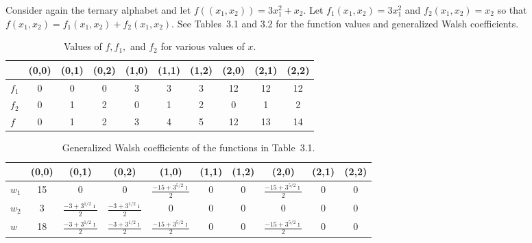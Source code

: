 \begin{example}
Consider again the ternary alphabet and let $f((x_1,x_2))=3 x_1^2 + x_2$.
Let $f_1(x_1,x_2)=3 x_1^2$ and $f_2(x_1,x_2)=x_2$ so that 
$f(x_1,x_2)=f_1(x_1,x_2)+f_2(x_1,x_2)$.  See Tables~3.1 and
3.2 for the function values and generalized Walsh coefficients.

\begin{table}
\begin{tabular}{l||c|c|c|c|c|c|c|c|c}
&	(0,0) &	(0,1) &	(0,2) &	(1,0) &	(1,1) &	(1,2) &	(2,0)&	(2,1)&	(2,2)\\
\hline
\hline
$f_1$ &	0 &	0&	0&	3&	3&	3&	12&	12&	12\\
$f_2$ &	0&	1&	2&	0&	1&	2&	0&	1&	2\\
$f$ &	0&	1&	2&	3&	4&	5&	12&	13&	14
\label{funvalues}
\end{tabular}
\caption{Values of $f, f_1,$ and $f_2$ for various values of $x$.}
\end{table}

\newcommand{\xx}{$\frac{-3+3^{1/2}\imath}{2}$}
\newcommand{\yy}{$\frac{-15+3^{5/2}\imath}{2}$}
\begin{table}
\begin{tabular}{l||c|c|c|c|c|c|c|c|c}
&	(0,0) &	(0,1) &	(0,2) &	(1,0) &	(1,1) &	(1,2) &	(2,0)&	(2,1)&	(2,2)\\
\hline
\hline
$w_1$ &15& 0& 0& \yy & 0& 0& \yy & 0& 0\\
$w_2$ &3& \xx & \xx & 0& 0& 0& 0& 0& 0\\
$w$ & 18& \xx & \xx & \yy &0 & 0 & \yy & 0& 0
\end{tabular}
\caption{Generalized Walsh coefficients of the functions in Table~3.1.}
\label{walshvalues}
\end{table}


\end{example}
